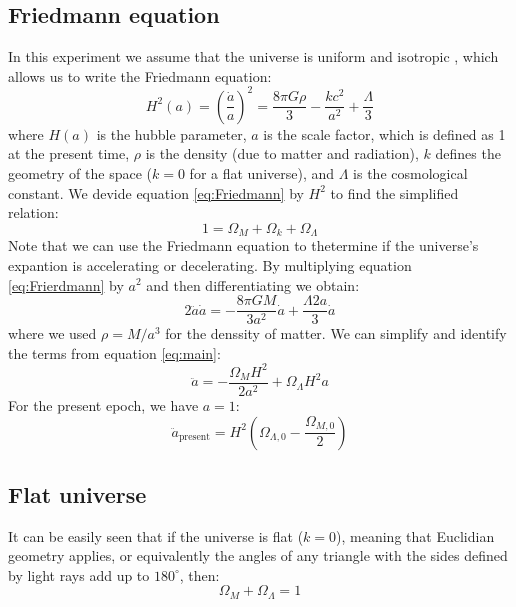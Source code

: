 \documentclass[11pt]{article}
\begin{document}
\subsection{Friedmann equation}
In this experiment we assume that the universe is uniform and isotropic \cite{AS37_lab_script}, which allows us to write the Friedmann equation: 
\begin{equation}
	H^2(a) = \left( \frac{\dot{a}}{a} \right)^2 = \frac{8 \pi G \rho}{3} - \frac{kc^2}{a^2} + \frac{\Lambda}{3}
	\label{eq:Friedmann}
\end{equation}
where $H(a)$ is the hubble parameter, $a$ is the scale factor, which is defined as 1 at the present time, $\rho$ is the density (due to matter and radiation), $k$ defines the geometry of the space ($k=0$ for a flat universe), and $\Lambda$ is the cosmological constant. We devide equation \eqref{eq:Friedmann} by $H^2$ to find the simplified relation: 
\begin{equation}
	1 = \Omega_M +\Omega_k + \Omega_\Lambda
	\label{eq:main}
\end{equation}
Note that we can use the Friedmann equation to thetermine if the universe's expantion is accelerating or decelerating. By multiplying equation \eqref{eq:Frierdmann} by $a^2$ and then differentiating we obtain: 
\begin{equation}
	2 \ddot{a} \dot{a} = -\frac{8 \pi G M}{3 a^2} \dot{a} + \frac{\Lambda 2 a}{3}  \dot{a}
\end{equation}
where we used $\rho = M/a^3$ for the denssity of matter. We can simplify and identify the terms from equation \eqref{eq:main}:
\begin{equation}
	\ddot{a} = -\frac{\Omega_M H^2}{2 a^2} + \Omega_{\Lambda} H^2 a
\end{equation}
For the present epoch, we have $a = 1$: 
\begin{equation}
	\ddot{a}_{\mathrm{present}} = H^2 \left(\Omega_{\Lambda,0} - \frac{\Omega_{M,0}}{2}\right)
	\label{eq:exp}
\end{equation}

\subsection{Flat universe}
It can be easily seen that if the universe is flat ($k = 0$), meaning that Euclidian geometry applies, or equivalently the angles of any triangle with the sides defined by light rays add up to $180^\circ$, then: 
\begin{equation}
	\Omega_M + \Omega_\Lambda = 1
	\label{eq:flat}
\end{equation}
\end{document}
